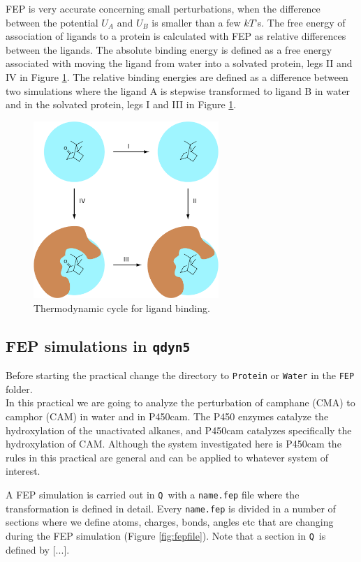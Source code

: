 \documentclass[a4paper,12pt]{article}
\newcommand{\qdyn}{\texttt{qdyn5}}
\newcommand{\q}{\texttt{Q}}
\begin{document}
FEP is very accurate concerning small perturbations, when the
difference between the potential $U_A$ and $U_B$ is smaller than
a few $kT$'s. The free energy of association of ligands to a protein is
calculated with FEP as relative differences between the ligands.
The absolute binding energy is defined as a free energy associated
with moving the ligand from water into a solvated protein, legs II and
IV in Figure \ref{fig:fep}. The relative binding energies are
defined as a difference between two simulations where the ligand A
is stepwise transformed to ligand B in water and in the solvated
protein, legs I and III in Figure \ref{fig:fep}.


\begin{figure}
\centering
\includegraphics[width=7cm]{LIE1}
\caption{\label{fig:fep} Thermodynamic cycle for ligand binding.}
\end{figure}
\newpage

\subsection{FEP simulations in \qdyn}

Before starting the practical change the directory to
\texttt{Protein} or \texttt{Water} in the \texttt{FEP} folder.\\

In this practical we are going to analyze the perturbation of
camphane (CMA) to camphor (CAM) in water and in P450cam. The P450
enzymes catalyze the hydroxylation of the unactivated alkanes, and
P450cam catalyzes specifically the hydroxylation of CAM. Although
the system investigated here is P450cam the rules in this
practical are general and can be applied to whatever system of
interest.

A FEP simulation is carried out in \q\ with a \texttt{name.fep}
file where the transformation is defined in detail. Every
\texttt{name.fep} is divided in a number of sections where we
define atoms, charges, bonds, angles etc that are changing during
the FEP simulation (Figure \ref{fig:fepfile}). Note that a section
in \q\ is defined by $[$...$]$.\\
\end{document}
